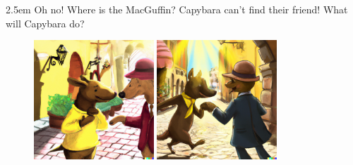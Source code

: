 \documentclass{article}
\newcommand{\imagewidthfactor}{0.4}
\newcommand{\addmarginA}{2.5em}
\newcommand{\addmarginB}{2.5em}
\begin{document}
\begin{addmargin}[\addmarginA]{\addmarginB}
Oh no! Where is the MacGuffin? Capybara can't find their friend! What will
Capybara do?
\end{addmargin}

\newpage %

\begin{figure}[h!]
\centering
\includegraphics[width=\imagewidthfactor\textwidth]{media/3a.png}
\quad
\includegraphics[width=\imagewidthfactor\textwidth]{media/3b.png}\\

\end{figure}
\end{document}
